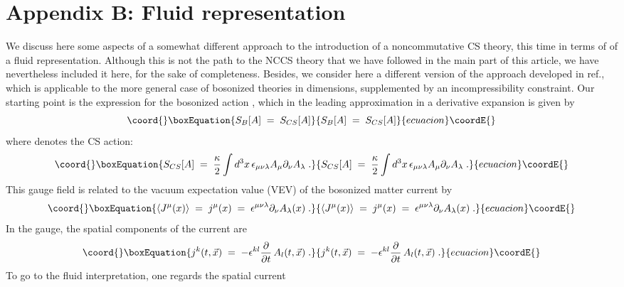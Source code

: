 \documentclass[a4paper,12pt]{article}
\begin{document}
\section*{Appendix B: Fluid representation}\label{sec:fluid}
We discuss here some aspects of a somewhat different approach to
the
introduction of a noncommutative CS theory, this time in terms of
of a
fluid representation. Although this is not the path to the NCCS
theory
that we have followed in the main part of this article, we have
nevertheless included it here, for the sake of completeness.
Besides,
we consider here a different version of the approach developed in
ref.\cite{susskind}, which is applicable to the more general case
of
bosonized theories in \coordHE{} dimensions, supplemented by an
incompressibility constraint.  Our starting point is the expression
for the bosonized action \coordHE{}, which in the leading
approximation
in a derivative expansion is given by
\begin{equation}\coord{}\boxEquation{
  \label{eq:boson}
S_B[A] \;=\; S_{CS}[A] 
}{
  S_B[A] \;=\; S_{CS}[A] 
}{ecuacion}\coordE{}\end{equation}
where \coordHE{} denotes the CS action:
\begin{equation}\coord{}\boxEquation{
  \label{eq:defscs}
S_{CS}[A] \;=\; \frac{\kappa}{2} \int d^3x
\,\epsilon_{\mu\nu\lambda} 
A_\mu \partial_\nu A_\lambda \;. 
}{
  S_{CS}[A] \;=\; \frac{\kappa}{2} \int d^3x
\,\epsilon_{\mu\nu\lambda} 
A_\mu \partial_\nu A_\lambda \;. 
}{ecuacion}\coordE{}\end{equation}
This gauge field is related to the vacuum expectation value (VEV)
of
the bosonized matter current by
\begin{equation}\coord{}\boxEquation{
  \label{eq:br}
\langle J^\mu(x) \rangle \;=\; j^\mu (x) \;=\; 
\epsilon^{\mu\nu\lambda} \partial_\nu A_\lambda (x) \;.
}{
  \langle J^\mu(x) \rangle \;=\; j^\mu (x) \;=\; 
\epsilon^{\mu\nu\lambda} \partial_\nu A_\lambda (x) \;.
}{ecuacion}\coordE{}\end{equation}
In the \coordHE{} gauge, the spatial components of the current are
\begin{equation}\coord{}\boxEquation{
  \label{eq:br1}
j^k (t,{\vec x}) \;=\; - \epsilon^{kl} \frac{\partial}{\partial t}
\, 
A_l (t,{\vec x})\;.
}{
  j^k (t,{\vec x}) \;=\; - \epsilon^{kl} \frac{\partial}{\partial t}
\, 
A_l (t,{\vec x})\;.
}{ecuacion}\coordE{}\end{equation}
To go to the fluid interpretation, one regards the spatial current
\end{document}
